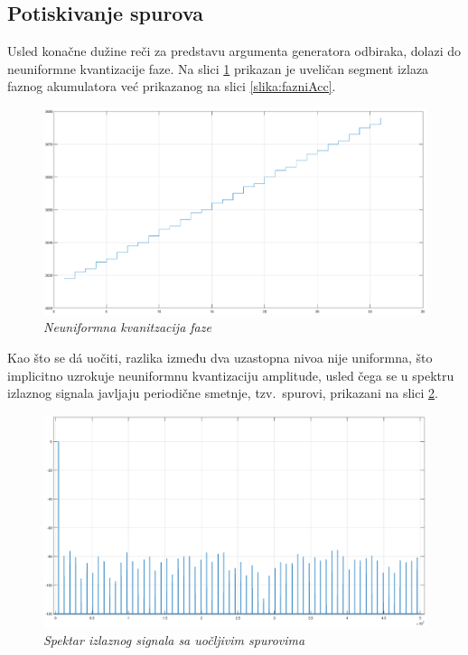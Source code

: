 \documentclass[conference]{IEEEtran}
\begin{document}
\subsection{Potiskivanje spurova}
Usled konačne dužine reči za predstavu argumenta generatora odbiraka, dolazi do neuniformne kvantizacije faze. Na slici \ref{slika:kvantFaze} prikazan je uveličan segment izlaza faznog akumulatora već prikazanog na slici \ref{slika:fazniAcc}.

\begin{figure}[h]
	\centering
	\includegraphics[scale=0.15]{./slike/kvantFaze.eps}
	\caption{\textsl{Neuniformna kvanitzacija faze}}
	\label{slika:kvantFaze}
\end{figure}

Kao što se d\'a uočiti, razlika između dva uzastopna nivoa nije uniformna, što implicitno uzrokuje neuniformnu kvantizaciju amplitude, usled čega se u spektru izlaznog signala javljaju periodične smetnje, tzv.~spurovi, prikazani na slici \ref{slika:spur}.

\begin{figure}[h]
	\centering
	\includegraphics[scale=0.15]{./slike/spur.eps}
	\caption{\textsl{Spektar izlaznog signala sa uočljivim spurovima}}
	\label{slika:spur}
\end{figure}
\end{document}
